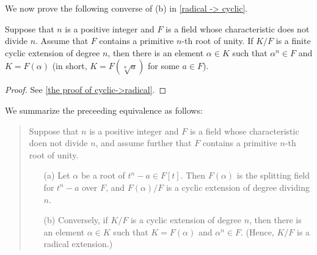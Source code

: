 We now prove the following converse of (b) in \cref{radical -> cyclic}.
\begin{prop}
    Suppose that $n$ is a positive integer and $F$ is a field whose characteristic does not divide $n$.
    Assume that $F$ contains a primitive $n$-th root of unity.
    If $K/F$ is a finite cyclic extension of degree $n$, then there is an element $\alpha\in K$ such that $\alpha^n\in F$ and $K=F(\alpha)$ (in short, $K=F(\sqrt[n]{a})$ for some $a\in F$).
\end{prop}
\begin{proof}
    See \cref{the proof of cyclic->radical}.
\end{proof}
\begin{rmk}
    We summarize the preceeding equivalence as follows:
    \begin{quotation}
        Suppose that $n$ is a positive integer and $F$ is a field whose characteristic doen not divide $n$, and assume further that $F$ contains a primitive $n$-th root of unity.
        \begin{enumerate}
            \item[(a)]
            {
                Let $\alpha$ be a root of $t^n-a\in F[t]$.
                Then $F(\alpha)$ is the splitting field for $t^n-a$ over $F$, and $F(\alpha)/F$ is a cyclic extension of degree dividing $n$.
            }
            \item[(b)]
            {
                Conversely, if $K/F$ is a cyclic extension of degree $n$, then there is an element $\alpha\in K$ such that $K=F(\alpha)$ and $\alpha^n\in F$.
                (Hence, $K/F$ is a radical extension.)
            }
        \end{enumerate}
    \end{quotation}
\end{rmk}